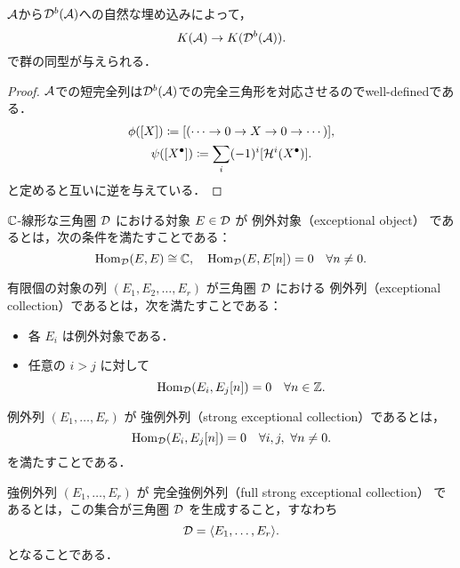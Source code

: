 \begin{prop}\cite{KS06}
	${\mathcal A}$から${\mathcal D}^b({\mathcal A})$への自然な埋め込みによって，
	\[K({\mathcal A})\rightarrow K({\mathcal D}^b({\mathcal A})).\]
	で群の同型が与えられる．
\end{prop}
\begin{proof}
	${\mathcal A}$での短完全列は${\mathcal D}^b({\mathcal A})$での完全三角形を対応させるのでwell-definedである．\\
	\begin{gather*}
		\phi([X])\coloneq [(\cdots\rightarrow 0\rightarrow X\rightarrow 0\rightarrow \cdots)],\\
		\psi([X^\bullet])\coloneq \sum_i(-1)^i[{\mathcal H}^i(X^\bullet)].
	\end{gather*}
	と定めると互いに逆を与えている．
\end{proof}

\begin{defn}[例外対象]\cite{BK89}
\label{defn:exceptional object}
${\mathbb C}$-線形な三角圏 \( {\mathcal D} \) における対象 \( E \in {\mathcal D} \) が 例外対象（exceptional object） であるとは，次の条件を満たすことである：
\[
\operatorname{\mathrm{Hom}}_{{\mathcal D}}(E, E) \cong {\mathbb C}, \quad \operatorname{\mathrm{Hom}}_{{\mathcal D}}(E, E[n]) = 0 \quad \forall n \ne 0.
\]
\end{defn}

\begin{defn}[例外列]\cite{BK89}
\label{defn:exceptional collection}
有限個の対象の列 \( (E_1, E_2, \dots, E_r) \) が三角圏 \( {\mathcal D} \) における 例外列（exceptional collection）であるとは，次を満たすことである：
\begin{itemize}
  \item 各 \( E_i \) は例外対象である．
  \item 任意の \( i > j \) に対して
  \[
  \operatorname{\mathrm{Hom}}_{{\mathcal D}}(E_i, E_j[n]) = 0 \quad  \forall n \in {\mathbb Z}.
  \]
\end{itemize}
\end{defn}

\begin{defn}[強例外列]\cite{BK89}
\label{defn:strong exceptional collection}
例外列 \( (E_1, \dots, E_r) \) が 強例外列（strong exceptional collection）であるとは，
\[
\Hom_{\D}(E_i, E_j[n]) = 0 \quad \forall i, j ,\ \forall n \ne 0.
\]
を満たすことである．
\end{defn}

\begin{defn}[完全強例外列]\cite{BK89}
\label{defn:full strong exceptional collection}
強例外列 \( (E_1, \dots, E_r) \) が 完全強例外列（full strong exceptional collection） であるとは，この集合が三角圏 \( {\mathcal D} \) を生成すること，すなわち
\[
{\mathcal D} = \langle E_1, \dots, E_r \rangle .
\]
となることである．
\end{defn}

